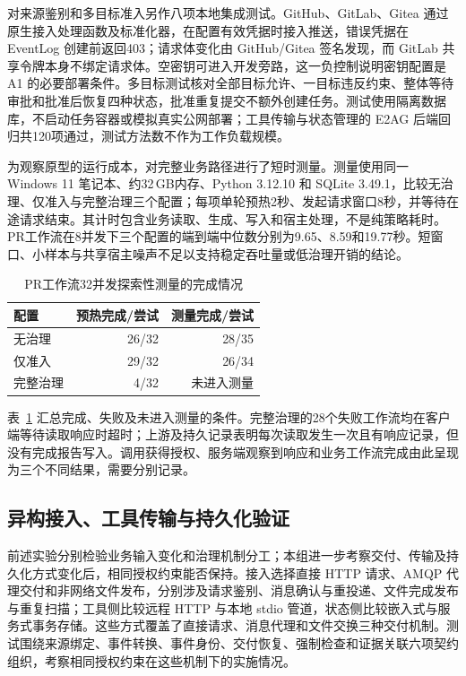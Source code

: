对来源鉴别和多目标准入另作八项本地集成测试。GitHub、GitLab、Gitea 通过原生接入处理函数及标准化器，在配置有效凭据时接入推送，错误凭据在 EventLog 创建前返回403；请求体变化由 GitHub/Gitea 签名发现，而 GitLab 共享令牌本身不绑定请求体。空密钥可进入开发旁路，这一负控制说明密钥配置是 A1 的必要部署条件。多目标测试核对全部目标允许、一目标违反约束、整体等待审批和批准后恢复四种状态，批准重复提交不额外创建任务。测试使用隔离数据库，不启动任务容器或模拟真实公网部署；工具传输与状态管理的 E2AG 后端回归共120项通过，测试方法数不作为工作负载规模。

为观察原型的运行成本，对完整业务路径进行了短时测量。测量使用同一 Windows 11 笔记本、约32\,GB内存、Python 3.12.10 和 SQLite 3.49.1，比较无治理、仅准入与完整治理三个配置；每项单轮预热2秒、发起请求窗口8秒，并等待在途请求结束。其计时包含业务读取、生成、写入和宿主处理，不是纯策略耗时。PR工作流在8并发下三个配置的端到端中位数分别为9.65、8.59和19.77秒。短窗口、小样本与共享宿主噪声不足以支持稳定吞吐量或低治理开销的结论。

\begin{table}[htbp]
\centering
\caption{PR工作流32并发探索性测量的完成情况}
\label{tab:exploratory-rr022}
\small
\begin{tabular}{lrr}
\toprule
配置 & 预热完成/尝试 & 测量完成/尝试 \\
\midrule
无治理 & 26/32 & 28/35 \\
仅准入 & 29/32 & 26/34 \\
完整治理 & 4/32 & 未进入测量 \\
\bottomrule
\end{tabular}
\end{table}

表~\ref{tab:exploratory-rr022} 汇总完成、失败及未进入测量的条件。完整治理的28个失败工作流均在客户端等待读取响应时超时；上游及持久记录表明每次读取发生一次且有响应记录，但没有完成报告写入。调用获得授权、服务端观察到响应和业务工作流完成由此呈现为三个不同结果，需要分别记录。

\subsection{异构接入、工具传输与持久化验证}
\label{sec:heterogeneity-rr022}

前述实验分别检验业务输入变化和治理机制分工；本组进一步考察交付、传输及持久化方式变化后，相同授权约束能否保持。接入选择直接 HTTP 请求、AMQP 代理交付和非网络文件发布，分别涉及请求鉴别、消息确认与重投递、文件完成发布与重复扫描；工具侧比较远程 HTTP 与本地 stdio 管道，状态侧比较嵌入式与服务式事务存储。这些方式覆盖了直接请求、消息代理和文件交换三种交付机制。测试围绕来源绑定、事件转换、事件身份、交付恢复、强制检查和证据关联六项契约组织，考察相同授权约束在这些机制下的实施情况。

